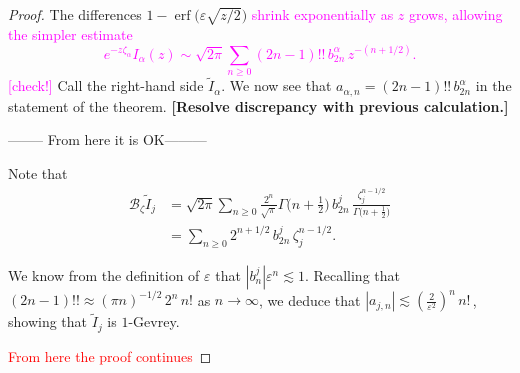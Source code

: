 \documentclass{article}
\theoremstyle{definition}
\newcommand{\borel}{\mathcal{B}}
\begin{document}
\begin{proof}
\color{black} %
The differences $1 - \operatorname{erf}\big(\varepsilon \sqrt{z/2}\big)$\textcolor{magenta}{ shrink exponentially as $z$ grows, allowing the simpler estimate
\[ e^{-z\zeta_\alpha} I_\alpha(z) \sim \sqrt{2\pi} \sum_{n \ge 0} (2n-1)!!\,b_{2n}^\alpha\,z^{-(n+1/2)}. \]} 
\textcolor{magenta}{[check!]}
Call the right-hand side $\tilde{I}_\alpha$. We now see that $a_{\alpha,n} = (2n-1)!!\,b_{2n}^\alpha$ in the statement of the theorem. \textbf{[Resolve discrepancy with previous calculation.]} 

-------- From here it is OK---------

\vspace{5mm}


Note that 
\begin{align*}
\borel_{\zeta} \tilde{I}_j & = \sqrt{2\pi} \sum_{n \ge 0} \frac{2^n}{\sqrt{\pi}} \Gamma\big(n+\tfrac{1}{2}\big)\,b_{2n}^j\,\frac{\zeta_j^{n-1/2}}{\Gamma\big(n+\tfrac{1}{2}\big)} \\
& = \sum_{n \ge 0} 2^{n+1/2}\,b_{2n}^j \,\zeta_j^{n-1/2}.
\end{align*}

We know from the definition of $\varepsilon$ that $\left|b_n^j\right| \varepsilon^n \lesssim 1$. Recalling that $(2n - 1)!! \approx (\pi n)^{-1/2}\,2^n\,n!$ as $n \to \infty$, we deduce that $|a_{j,n}| \lesssim \left(\tfrac{2}{\varepsilon^2}\right)^n\,n!\,$, showing that $\tilde{I}_j$ is $1$-Gevrey.


\textcolor{red}{From here the proof continues}



\end{proof}
\end{document}
